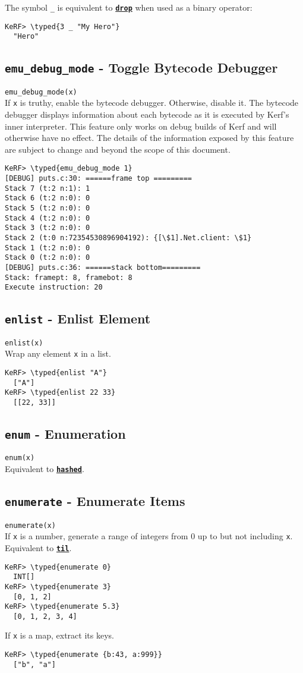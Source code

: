 \documentclass{article}
\newcommand{\typed}[1]{\textcolor{TealBlue}{#1}}
\newcommand{\primdefu}[3]{\subsection{\texttt{#1} - #2}\label{prim:#3}}
\newcommand{\primu}[2]{\hyperref[prim:#2]{\textbf{\texttt{#1}}}}
\newcommand{\primdef}[2]{\primdefu{#1}{#2}{#1}}
\newcommand{\prim}[1]{\primu{#1}{#1}}
\begin{document}
The symbol \texttt{\_} is equivalent to \prim{drop} when used as a binary operator:
\begin{Verbatim}
KeRF> \typed{3 _ "My Hero"}
  "Hero"
\end{Verbatim}

\primdefu{emu\_debug\_mode}{Toggle Bytecode Debugger}{emuDebugMode}
\texttt{emu\_debug\_mode(x)}\\

If \texttt{x} is truthy, enable the bytecode debugger. Otherwise, disable it. The bytecode debugger displays information about each bytecode as it is executed by Kerf's inner interpreter. This feature only works on debug builds of Kerf and will otherwise have no effect. The details of the information exposed by this feature are subject to change and beyond the scope of this document.

\begin{Verbatim}
KeRF> \typed{emu_debug_mode 1}
[DEBUG] puts.c:30: ======frame top =========
Stack 7 (t:2 n:1): 1
Stack 6 (t:2 n:0): 0
Stack 5 (t:2 n:0): 0
Stack 4 (t:2 n:0): 0
Stack 3 (t:2 n:0): 0
Stack 2 (t:0 n:72354530896904192): {[\$1].Net.client: \$1}
Stack 1 (t:2 n:0): 0
Stack 0 (t:2 n:0): 0
[DEBUG] puts.c:36: ======stack bottom=========
Stack: framept: 8, framebot: 8
Execute instruction: 20
\end{Verbatim}

\primdef{enlist}{Enlist Element}
\texttt{enlist(x)}\\

Wrap any element \texttt{x} in a list.
\begin{Verbatim}
KeRF> \typed{enlist "A"}
  ["A"]
KeRF> \typed{enlist 22 33}
  [[22, 33]]
\end{Verbatim}

\primdef{enum}{Enumeration}
\texttt{enum(x)}\\

Equivalent to \prim{hashed}.

\primdef{enumerate}{Enumerate Items}
\texttt{enumerate(x)}\\

If \texttt{x} is a number, generate a range of integers from 0 up to but not including \texttt{x}. Equivalent to \prim{til}.
\begin{Verbatim}
KeRF> \typed{enumerate 0}
  INT[]
KeRF> \typed{enumerate 3}
  [0, 1, 2]
KeRF> \typed{enumerate 5.3}
  [0, 1, 2, 3, 4]
\end{Verbatim}

\pagebreak
If \texttt{x} is a map, extract its keys.
\begin{Verbatim}
KeRF> \typed{enumerate {b:43, a:999}}
  ["b", "a"]
\end{Verbatim}
\end{document}

